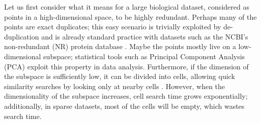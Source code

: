 \documentclass[review,preprint,12pt]{elsarticle}
\renewcommand{\cite}{\citep} %
\theoremstyle{definition}
\theoremstyle{remark}
\numberwithin{equation}{section}
\begin{document}
Let us first consider what it means for a large biological dataset, considered as points in a high-dimensional space, to be highly redundant.
Perhaps many of the points are exact duplicates; this easy scenario is trivially exploited by de-duplication and is already standard practice with datasets such as
the NCBI's non-redundant (NR) protein database \cite{pruitt2005ncbi}.
Maybe the points mostly live on a low-dimensional subspace; statistical tools such as Principal Component Analysis (PCA) exploit this property in data analysis.
Furthermore, if the dimension of the subspace is sufficiently low,
it can be divided into cells, allowing quick similarity searches by looking only at nearby cells \cite{weber1998quantitative}.
However, when the dimensionality of the subspace increases, cell search time 
grows exponentially; additionally, in sparse datasets, most of the cells will 
be empty, which wastes search time.
\end{document}
